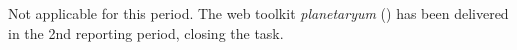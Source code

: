\smallskip
\subparagraph{} Not
applicable for this period.  The web toolkit \textit{planetaryum}
() has been delivered in the 2nd reporting
period, closing the task.



